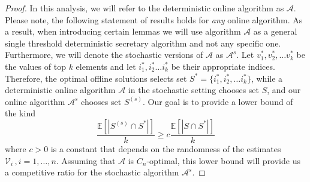 \begin{proof}
In this analysis, we will refer to the deterministic online algorithm as $\mathcal{A}$. Please note, the following statement of results holds for \textit{any} online algorithm. As a result, when introducing certain lemmas we will use algorithm $\mathcal{A}$ as a general single threshold deterministic secretary algorithm and not any specific one. Furthermore, we will denote the stochastic versions of $\mathcal{A}$ as $\mathcal{A}^{s}$.
Let $v_1^*, v_2^*, \dots v_k^*$ be the values of top $k$ elements and let $i_1^*, i_2^* \dots i_k^*$ be their appropriate indices. Therefore, the optimal offline solutions selects set 
$S^* = \{i_1^*, i_2^*, \dots i_k^*\}$, while a deterministic online algorithm $\mathcal{A}$ in the stochastic setting chooses set $S$, and our online algorithm $\mathcal{A}^{s}$ chooses set $S^{(s)}$. Our goal is to provide a lower bound of the kind
\begin{equation}
     \frac{\mathbb E[|S^{(s)} \cap S^*|]}{k} \geq c\frac{\mathbb E[|S \cap S^*|]}{k}
\end{equation}
where $c>0$ is a constant that depends on the randomness of the estimates $\mathcal{V}_i\,,i=1,\ldots,n.$ 
Assuming that $\mathcal{A}$ is $C_n$-optimal, this lower bound will provide us a competitive ratio for the stochastic algorithm $\mathcal{A}^{s}$.

% 



\end{proof}

